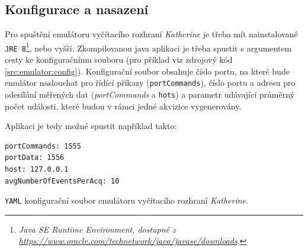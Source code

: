 \subsection{Konfigurace a nasazení}
Pro spuštění emulátoru vyčítacího rozhraní \textit{Katherine} je třeba mít nainstalované \texttt{JRE 8}\footnote{\textit{Java SE Runtime Environment, dostupné z\\\url{https://www.oracle.com/technetwork/java/javase/downloads}}.}, nebo vyšší.
Zkompilovanou java aplikaci je třeba spustit s argumentem cesty ke konfiguračnímu souboru (pro příklad viz zdrojový kód \ref{src:emulator:config}). Konfigurační soubor obsahuje číslo portu, na které bude emulátor naslouchat pro řídící příkazy (\texttt{portCommands}), číslo portu a adresu pro odesílání měřených dat (\textit{portCommands} a \texttt{hots}) a parametr udávající průměrný počet události, které budou v rámci jedné akvizice vygenerovány.

Aplikaci je tedy možné spustit například takto: 

\begin{code}[h]
  \begin{verbatim}
portCommands: 1555
portData: 1556
host: 127.0.0.1
avgNumberOfEventsPerAcq: 10
\end{verbatim}
\caption{\texttt{YAML} konfigurační soubor emulátoru vyčítacího rozhraní \textit{Katherine}.}
\label{src:emulator:config}
\end{code}